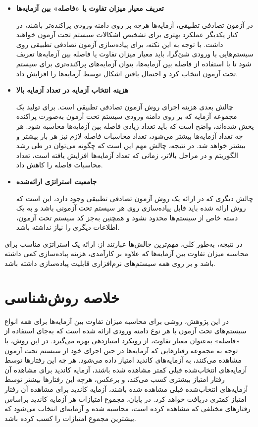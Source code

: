 \begin{itemize}
	\item \textbf{تعریف معیار میزان تفاوت یا «فاصله» بین آزمایه‌ها}
	
در آزمون تصادفی تطبیقی، آزمایه‌ها هرچه بر روی دامنه ورودی پراکنده‌تر باشند، در کنار یکدیگر عملکرد بهتری برای تشخیص اشکالات سیستم تحت آزمون خواهند داشت. با توجه به این نکته، برای پیاده‌سازی آزمون تصادفی تطبیقی روی سیستم‌هایی با ورودی شئ‌گرا، باید معیار میزان تفاوت یا فاصله بین آزمایه‌ها تعریف شود تا با استفاده از فاصله بین آزمایه‌ها، بتوان آزمایه‌های پراکنده‌تری برای سیستم تحت آزمون انتخاب کرد و احتمال یافتن اشکال توسط آزمایه‌ها را افزایش داد.
	
	\item \textbf{هزینه انتخاب آزمایه در تعداد آزمایه بالا}
	
چالش بعدی هزینه اجرای روش آزمون تصادفی تطبیقی است. برای تولید یک مجموعه آزمایه که بر روی دامنه ورودی سیستم تحت آزمون به‌صورت پراکنده پخش شده‌اند، واضح است که باید تعداد زیادی فاصله بین آزمایه‌ها محاسبه شود. هر چه تعداد آزمایه‌ها بیشتر می‌شود، تعداد محاسبات فاصله لازم نیز هر بار بیشتر و بیشتر خواهد شد. در نتیجه، چالش مهم این است که چگونه می‌توان در طی رشد الگوریتم و در مراحل بالاتر، زمانی که تعداد آزمایه‌ها افزایش یافته است، تعداد محاسبات فاصله را کاهش داد.
	
	\item \textbf{جامعیت استراتژی ارائه‌شده}
	
چالش دیگری که در ارائه یک روش آزمون تصادفی تطبیقی وجود دارد، این است که روش ارائه شده باید قابل پیاده‌سازی روی هر سیستم تحت آزمونی باشد و به یک دسته خاص از سیستم‌ها محدود نشود و همچنین به‌جز کد سیستم تحت آزمون، اطلاعات دیگری را نیاز نداشته باشد.

\end{itemize}

در نتیجه، به‌طور کلی، مهم‌ترین چالش‌ها عبارتند از: ارائه یک استراتژی مناسب برای محاسبه میزان تفاوت بین آزمایه‌ها که علاوه بر کارآمدی، هزینه پیاده‌سازی کمی داشته باشد و بر روی همه سیستم‌های نرم‌افزاری قابلیت پیاده‌سازی داشته باشد.

\section{خلاصه روش‌شناسی}

در این پژوهش، روشی برای محاسبه میزان تفاوت بین آزمایه‌ها برای همه انواع سیستم‌های تحت آزمون با هر نوع دامنه ورودی ارائه شده است که به‌جای استفاده از «فاصله» به‌عنوان معیار تفاوت، از رویکرد امتیازدهی بهره می‌گیرد. در این روش، با توجه به مجموعه‌ رفتارهایی که آزمایه‌ها در حین اجرای خود از سیستم تحت آزمون مشاهده می‌کنند، به آزمایه‌های کاندید امتیاز داده می‌شود. هر چه این رفتارها توسط آزمایه‌های انتخاب‌شده قبلی کمتر مشاهده شده باشند، آزمایه کاندید برای مشاهده آن رفتار امتیاز بیشتری کسب می‌کند، و برعکس، هرچه این رفتارها بیشتر توسط آزمایه‌های انتخاب‌شده قبلی مشاهده شده باشند، آزمایه کاندید برای مشاهده آن رفتار امتیاز کمتری دریافت خواهد کرد. در پایان، مجموع امتیازات هر آزمایه کاندید براساس رفتارهای مختلفی که مشاهده کرده است، محاسبه شده و آزمایه‌ای انتخاب می‌شود که بیشترین مجموع امتیازات را کسب کرده باشد.

